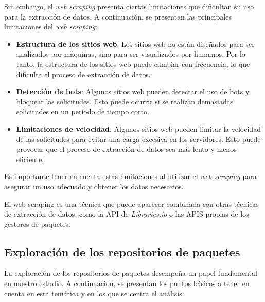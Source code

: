 Sin embargo, el \textit{web scraping} presenta ciertas limitaciones que dificultan su uso
para la extracción de datos. A continuación, se presentan las principales limitaciones del
\textit{web scraping}:

\begin{itemize}
    \item \textbf{Estructura de los sitios web}: Los sitios web no están diseñados para
          ser analizados por máquinas, sino para ser visualizados por humanos. Por lo tanto,
          la estructura de los sitios web puede cambiar con frecuencia, lo que dificulta
          el proceso de extracción de datos.
    \item \textbf{Detección de bots}: Algunos sitios web pueden detectar el uso de bots
          y bloquear las solicitudes. Esto puede ocurrir si se realizan demasiadas solicitudes
          en un período de tiempo corto.
    \item \textbf{Limitaciones de velocidad}: Algunos sitios web pueden limitar la velocidad
          de las solicitudes para evitar una carga excesiva en los servidores. Esto puede
          provocar que el proceso de extracción de datos sea más lento y menos eficiente.
\end{itemize}

Es importante tener en cuenta estas limitaciones al utilizar el \textit{web scraping} para
asegurar un uso adecuado y obtener los datos necesarios.

El web scraping es una técnica que puede aparecer combinada con otras técnicas de extracción
de datos, como la API de \textit{Libraries.io} o las APIS propias de los gestores de paquetes. 

\subsection{Exploración de los repositorios de paquetes}

La exploración de los repositorios de paquetes desempeña un papel fundamental en nuestro estudio.
A continuación, se presentan los puntos básicos a tener en cuenta en esta temática y en los que se
centra el análisis:

